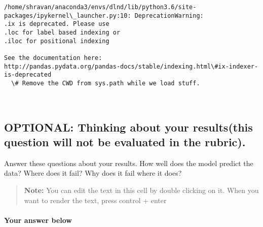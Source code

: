 \documentclass[11pt]{article}
\begin{document}
    \begin{Verbatim}[commandchars=\\\{\}]
/home/shravan/anaconda3/envs/dlnd/lib/python3.6/site-packages/ipykernel\_launcher.py:10: DeprecationWarning: 
.ix is deprecated. Please use
.loc for label based indexing or
.iloc for positional indexing

See the documentation here:
http://pandas.pydata.org/pandas-docs/stable/indexing.html\#ix-indexer-is-deprecated
  \# Remove the CWD from sys.path while we load stuff.

    \end{Verbatim}

    \begin{center}
    \end{center}
    { \hspace*{\fill} \\}
    
    \subsection{OPTIONAL: Thinking about your results(this question will not
be evaluated in the
rubric).}\label{optional-thinking-about-your-resultsthis-question-will-not-be-evaluated-in-the-rubric.}

Answer these questions about your results. How well does the model
predict the data? Where does it fail? Why does it fail where it does?

\begin{quote}
\textbf{Note:} You can edit the text in this cell by double clicking on
it. When you want to render the text, press control + enter
\end{quote}

\paragraph{Your answer below}\label{your-answer-below}


    
    
    
    
\end{document}
